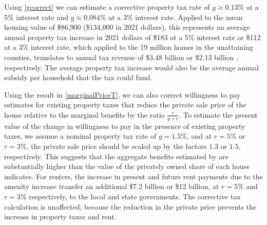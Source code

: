 \documentclass[ecta,nameyear,draft]{econsocart}
\theoremstyle{plain}
\theoremstyle{remark}
\begin{document}
Using \ref{gcorrect} we can estimate a corrective property tax rate of $g\approx 0.13\%$ at a 5\% interest rate and $g\approx 0.084\%$ at a 3\% interest rate. Applied to the mean housing value of \$86,900 (\$134,000 in 2021 dollars), this represents an average annual property tax increase in 2021 dollars of \$183 at a 5\% interest rate or \$112 at a 3\% interest rate, which applied to the 19 million homes in the unattaining counties, translates to annual tax revenue of \$3.48 billion %
or \$2.13 billion 
, respectively. The average property tax increase would also be the average annual subsidy per household that the tax could fund. 

Using the result in \ref{marginalPriceT}, we can also correct willingness to pay estimates for existing property taxes that reduce the private sale price of the house relative to the marginal benefits by the ratio $\frac{r}{g+r}$. To estimate the present value of the change in willingness to pay in the presence of existing property taxes, we assume a nominal property tax rate of $g=1.5\%$, and at $r=5\%$ or $r=3\%$, the private sale price should be scaled up by the factors $1.3$ or $1.5$, respectively. This suggests that the aggregate benefits estimated by \cite{chaygreenstone05} are substantially higher than the value of the privately owned share of each house indicates. For renters, the increase in present and future rent payments due to the amenity increase transfer an additional \$7.2 billion or \$12 billion, at $r=5\%$ and $r=3\%$ respectively, to the local and state governments. The corrective tax calculation is unaffected, because the reduction in the private price prevents the increase in property taxes and rent.

\end{document}
